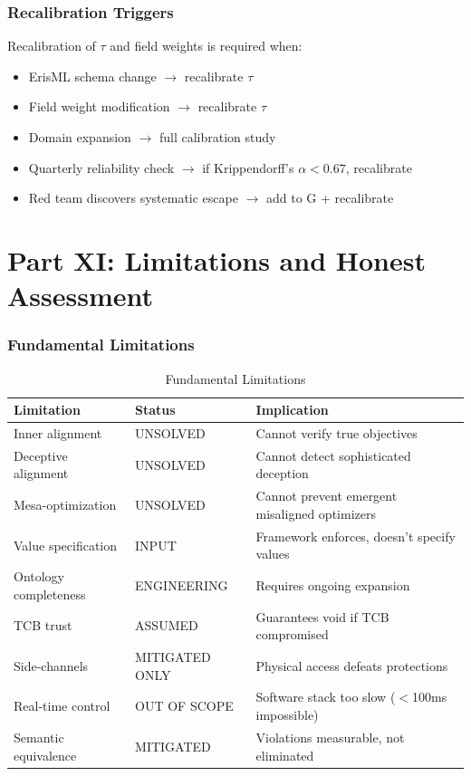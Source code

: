 \documentclass[11pt,letterpaper]{article}
\theoremstyle{definition}
\theoremstyle{remark}
\begin{document}
\section{Recalibration Triggers}

Recalibration of $\tau$ and field weights is required when:
\begin{itemize}
\item ErisML schema change $\to$ recalibrate $\tau$
\item Field weight modification $\to$ recalibrate $\tau$
\item Domain expansion $\to$ full calibration study
\item Quarterly reliability check $\to$ if Krippendorff's $\alpha < 0.67$, recalibrate
\item Red team discovers systematic escape $\to$ add to G + recalibrate
\end{itemize}



\part*{Part XI: Limitations and Honest Assessment}

\section{Fundamental Limitations}

\begin{table}[h]
\centering
\small
\begin{tabular}{@{}lll@{}}
\toprule
\textbf{Limitation} & \textbf{Status} & \textbf{Implication} \\
\midrule
Inner alignment & UNSOLVED & Cannot verify true objectives \\
Deceptive alignment & UNSOLVED & Cannot detect sophisticated deception \\
Mesa-optimization & UNSOLVED & Cannot prevent emergent misaligned optimizers \\
Value specification & INPUT & Framework enforces, doesn't specify values \\
Ontology completeness & ENGINEERING & Requires ongoing expansion \\
TCB trust & ASSUMED & Guarantees void if TCB compromised \\
Side-channels & MITIGATED ONLY & Physical access defeats protections \\
Real-time control & OUT OF SCOPE & Software stack too slow ($<$100ms impossible) \\
Semantic equivalence & MITIGATED & Violations measurable, not eliminated \\
\bottomrule
\end{tabular}
\caption{Fundamental Limitations}
\end{table}
\end{document}
